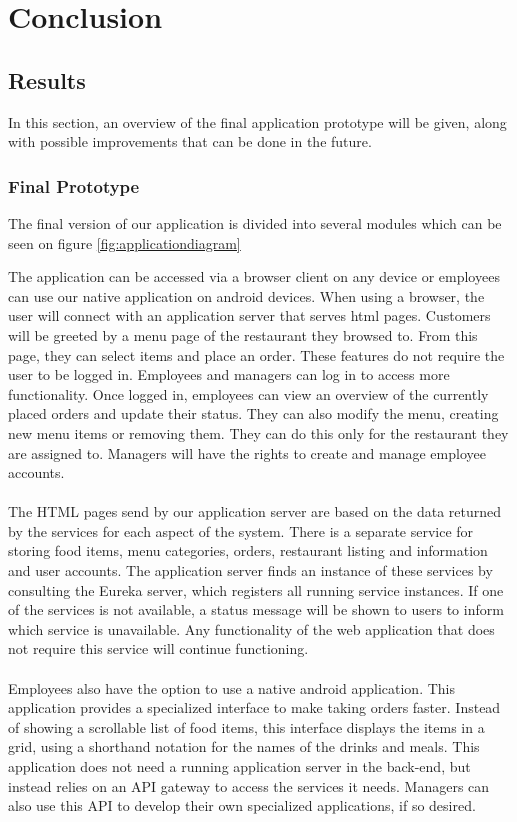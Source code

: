 \documentclass[12pt]{article}
\begin{document}
\section{Conclusion}
\begin{multicols}{2}
\subsection{Results}\label{sec:results}

\noindent In this section, an overview of the final application prototype will be given, along with possible improvements that can be done in the future.
\subsubsection{Final Prototype}
The final version of our application is divided into several modules which can be seen on figure \ref{fig:applicationdiagram}

\noindent The application can be accessed via a browser client on any device or employees can use our native application on android devices. When using a browser, the user will connect with an application server that serves html pages. Customers will be greeted by a menu page of the restaurant they browsed to. From this page, they can select items and place an order. These features do not require the user to be logged in. Employees and managers can log in to access more functionality. Once logged in, employees can view an overview of the currently placed orders and update their status. They can also modify the menu, creating new menu items or removing them. They can do this only for the restaurant they are assigned to. Managers will have the rights to create and manage employee accounts.
\\\\
The HTML pages send by our application server are based on the data returned by the services for each aspect of the system. There is a separate service for storing food items, menu categories, orders, restaurant listing and information and user accounts. The application server finds an instance of these services by consulting the Eureka server, which registers all running service instances. If one of the services is not available, a status message will be shown to users to inform which service is unavailable. Any functionality of the web application that does not require this service will continue functioning.
\\\\ 
Employees also have the option to use a native android application. This application provides a specialized interface to make taking orders faster. Instead of showing a scrollable list of food items, this interface displays the items in a grid, using a shorthand notation for the names of the drinks and meals. This application does not need a running application server in the back-end, but instead relies on an API gateway to access the services it needs. Managers can also use this API to develop their own specialized applications, if so desired.

\end{multicols}
\end{document}
